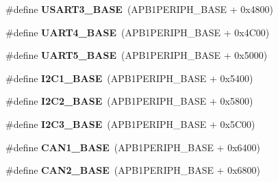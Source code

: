 \begin{DoxyCompactItemize}
\item 
\#define {\bfseries U\+S\+A\+R\+T3\+\_\+\+B\+A\+SE}~(A\+P\+B1\+P\+E\+R\+I\+P\+H\+\_\+\+B\+A\+SE + 0x4800)\hypertarget{group___peripheral__memory__map_gabe0d6539ac0026d598274ee7f45b0251}{}\label{group___peripheral__memory__map_gabe0d6539ac0026d598274ee7f45b0251}

\item 
\#define {\bfseries U\+A\+R\+T4\+\_\+\+B\+A\+SE}~(A\+P\+B1\+P\+E\+R\+I\+P\+H\+\_\+\+B\+A\+SE + 0x4\+C00)\hypertarget{group___peripheral__memory__map_ga94d92270bf587ccdc3a37a5bb5d20467}{}\label{group___peripheral__memory__map_ga94d92270bf587ccdc3a37a5bb5d20467}

\item 
\#define {\bfseries U\+A\+R\+T5\+\_\+\+B\+A\+SE}~(A\+P\+B1\+P\+E\+R\+I\+P\+H\+\_\+\+B\+A\+SE + 0x5000)\hypertarget{group___peripheral__memory__map_gaa155689c0e206e6994951dc3cf31052a}{}\label{group___peripheral__memory__map_gaa155689c0e206e6994951dc3cf31052a}

\item 
\#define {\bfseries I2\+C1\+\_\+\+B\+A\+SE}~(A\+P\+B1\+P\+E\+R\+I\+P\+H\+\_\+\+B\+A\+SE + 0x5400)\hypertarget{group___peripheral__memory__map_gacd72dbffb1738ca87c838545c4eb85a3}{}\label{group___peripheral__memory__map_gacd72dbffb1738ca87c838545c4eb85a3}

\item 
\#define {\bfseries I2\+C2\+\_\+\+B\+A\+SE}~(A\+P\+B1\+P\+E\+R\+I\+P\+H\+\_\+\+B\+A\+SE + 0x5800)\hypertarget{group___peripheral__memory__map_ga04bda70f25c795fb79f163b633ad4a5d}{}\label{group___peripheral__memory__map_ga04bda70f25c795fb79f163b633ad4a5d}

\item 
\#define {\bfseries I2\+C3\+\_\+\+B\+A\+SE}~(A\+P\+B1\+P\+E\+R\+I\+P\+H\+\_\+\+B\+A\+SE + 0x5\+C00)\hypertarget{group___peripheral__memory__map_ga4e8b9198748235a1729e1e8f8f24983b}{}\label{group___peripheral__memory__map_ga4e8b9198748235a1729e1e8f8f24983b}

\item 
\#define {\bfseries C\+A\+N1\+\_\+\+B\+A\+SE}~(A\+P\+B1\+P\+E\+R\+I\+P\+H\+\_\+\+B\+A\+SE + 0x6400)\hypertarget{group___peripheral__memory__map_gad8e45ea6c032d9fce1b0516fff9d8eaa}{}\label{group___peripheral__memory__map_gad8e45ea6c032d9fce1b0516fff9d8eaa}

\item 
\#define {\bfseries C\+A\+N2\+\_\+\+B\+A\+SE}~(A\+P\+B1\+P\+E\+R\+I\+P\+H\+\_\+\+B\+A\+SE + 0x6800)\hypertarget{group___peripheral__memory__map_gaf7b8267b0d439f8f3e82f86be4b9fba1}{}\label{group___peripheral__memory__map_gaf7b8267b0d439f8f3e82f86be4b9fba1}


\end{DoxyCompactItemize}
